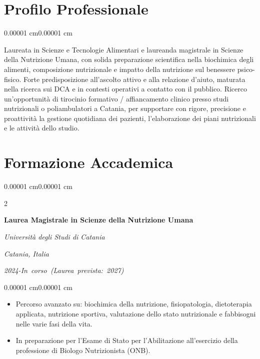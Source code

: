 \documentclass[10pt, letterpaper]{article}
\newenvironment{highlights}{
    \begin{itemize}[
        topsep=0.06 cm,
        parsep=0.04 cm,
        partopsep=0pt,
        itemsep=0pt,
        leftmargin=0.4 cm + 10pt
    ]
}{
    \end{itemize}
}
\newenvironment{onecolentry}{
    \begin{adjustwidth}{0.00001 cm}{0.00001 cm}
}{
    \end{adjustwidth}
}
\newenvironment{twocolentry}[2][]{
    \onecolentry
    \def\secondColumn{#2}
    \setcolumnwidth{\fill, 6.0 cm}
    \begin{paracol}{2}
}{
    \switchcolumn \raggedleft \secondColumn
    \end{paracol}
    \endonecolentry
}
\begin{document}
    \section{Profilo Professionale}
    \begin{onecolentry}
        Laureata in Scienze e Tecnologie Alimentari e laureanda magistrale in Scienze della Nutrizione Umana, con solida preparazione scientifica nella biochimica degli alimenti, composizione nutrizionale e impatto della nutrizione sul benessere psico-fisico. Forte predisposizione all'ascolto attivo e alla relazione d'aiuto, maturata nella ricerca sui DCA e in contesti operativi a contatto con il pubblico. Ricerco un'opportunità di tirocinio formativo / affiancamento clinico presso studi nutrizionali o poliambulatori a Catania, per supportare con rigore, precisione e proattività la gestione quotidiana dei pazienti, l'elaborazione dei piani nutrizionali e le attività dello studio.
    \end{onecolentry}

    \vspace{0.1 cm}

    \section{Formazione Accademica}

        \begin{twocolentry}{
            \textit{Catania, Italia}\vspace{0 cm}
            
            \mbox{\textit{2024-In corso (Laurea prevista: 2027)}}
        }
            \textbf{Laurea Magistrale in Scienze della Nutrizione Umana}\vspace{0 cm}
            
            \textit{Università degli Studi di Catania}
        \end{twocolentry}
        \vspace{0.1 cm}
        \begin{onecolentry}
            \begin{highlights}
                \item Percorso avanzato su: biochimica della nutrizione, fisiopatologia, dietoterapia applicata, nutrizione sportiva, valutazione dello stato nutrizionale e fabbisogni nelle varie fasi della vita.
                \item In preparazione per l'Esame di Stato per l'Abilitazione all'esercizio della professione di Biologo Nutrizionista (ONB).
            \end{highlights}
        \end{onecolentry}
\end{document}
